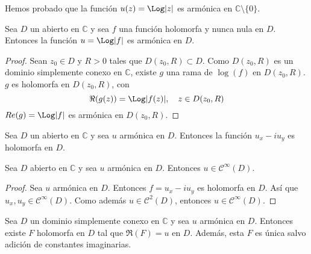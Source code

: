 Hemos probado que la función $u(z) = \Log|z|$ es armónica en $\mathbb{C} \setminus \{0\}$.

\begin{lemma}
    Sea $D$ un abierto en $\mathbb{C}$ y sea $f$ una función holomorfa y nunca nula en $D$.
    Entonces la función $u = \Log|f|$ es armónica en $D$.
\end{lemma}

\begin{proof}
    Sean $z_0 \in D$ y $R > 0$ tales que $D(z_0, R) \subset D$.
    Como $D(z_0, R)$ es un dominio simplemente conexo en $\mathbb{C}$, existe $g$ una rama de $\log(f)$ en $D(z_0, R)$.
    $g$ es holomorfa en $D(z_0, R)$, con
    $$\Re(g(z)) = \Log|f(z)|, \quad z \in D(z_0, R)$$
    $Re(g) = \Log|f|$ es armónica en $D(z_0, R)$.
\end{proof}

\begin{proposition}
    Sea $D$ un abierto en $\mathbb{C}$ y sea $u$ armónica en $D$.
    Entonces la función $u_x - iu_y$ es holomorfa en $D$.
\end{proposition}

\begin{corollary}
    Sea $D$ abierto en $\mathbb{C}$ y sea $u$ armónica en $D$.
    Entonces $u \in \mathcal{C}^\infty(D)$.
\end{corollary}

\begin{proof}
    Sea $u$ armónica en $D$.
    Entonces $f = u_x - iu_y$ es holomorfa en $D$.
    Así que $u_x, u_y \in \mathcal{C}^\infty(D)$.
    Como además $u \in \mathcal{C}^2(D)$, entonces $u \in \mathcal{C}^\infty(D)$.
\end{proof}

\begin{proposition}
    Sea $D$ un dominio simplemente conexo en $\mathbb{C}$ y sea $u$ armónica en $D$.
    Entonces existe $F$ holomorfa en $D$ tal que $\Re(F) = u$ en $D$.
    Además, esta $F$ es única salvo adición de constantes imaginarias.
\end{proposition}

